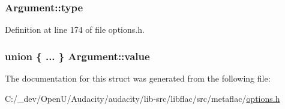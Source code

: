 \subsubsection[{\texorpdfstring{type}{type}}]{ Argument\+::type}\hypertarget{struct_argument_a94fa591eeb1e00b971de97ed04cb89a6}{}\label{struct_argument_a94fa591eeb1e00b971de97ed04cb89a6}


Definition at line 174 of file options.\+h.

\subsubsection[{\texorpdfstring{value}{value}}]{\setlength{\rightskip}{0pt plus 5cm}union \{ ... \}   Argument\+::value}\hypertarget{struct_argument_ac4443c3ab6f2f1aa4970cf9eba6a8174}{}\label{struct_argument_ac4443c3ab6f2f1aa4970cf9eba6a8174}


The documentation for this struct was generated from the following file\+:\begin{DoxyCompactItemize}
\item 
C\+:/\+\_\+dev/\+Open\+U/\+Audacity/audacity/lib-\/src/libflac/src/metaflac/\hyperlink{libflac_2src_2metaflac_2options_8h}{options.\+h}\end{DoxyCompactItemize}
